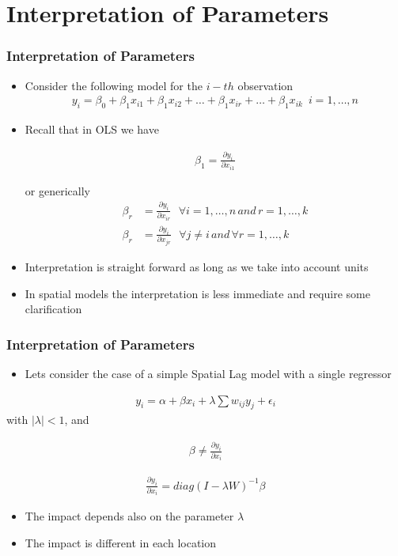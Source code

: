 \documentclass[
  shownotes,
  xcolor={svgnames},
  hyperref={colorlinks,citecolor=DarkBlue,linkcolor=DarkRed,urlcolor=DarkBlue}
  ]{beamer}
\begin{document}
\section{Interpretation of Parameters}
\begin{frame}
\frametitle{Interpretation of Parameters}
\begin{itemize}
  \item Consider the following model for the $i-th$ observation
\begin{align}
y_i = \beta_0 +\beta_1 x_{i1}+\beta_1 x_{i2}+\dots+\beta_1 x_{ir}+\dots+\beta_1 x_{ik} \,\,\, i=1,\dots,n \nonumber
\end{align}

  \item Recall that in OLS we have


\begin{align}
\beta_1=\frac{\partial y_i}{\partial x_{i1}} \nonumber
\end{align}

or generically
\begin{align}
\beta_r&=\frac{\partial y_i}{\partial x_{ir}}  \,\,\,\,  \forall i=1,\dots,n\,and\, r=1,\dots,k \nonumber \\
\beta_r&=\frac{\partial y_i}{\partial x_{jr}} \,\,\,\,  \forall j\neq i\,and\, \forall r=1,\dots,k \nonumber
\end{align}

\item Interpretation is straight forward as long as we take into account units
\medskip
\item In spatial models the interpretation is less immediate and require some clarification
\end{itemize}

\end{frame}
\begin{frame}
\frametitle{Interpretation of Parameters}
\begin{itemize}
\item Lets consider the case of a simple Spatial Lag model with a single regressor
\end{itemize}

\begin{align}
y_i = \alpha + \beta x_i + \lambda \sum w_{ij} y_j + \epsilon_i
\end{align}
with $|\lambda|<1$, and 

\begin{align}
\beta \neq \frac{\partial y_i}{\partial x_{i}} \nonumber
\end{align}

\begin{align}
 \frac{\partial y_i}{\partial x_{i}} = diag(I-\lambda W)^{-1}\beta \nonumber
\end{align}
\begin{itemize}
  \item The impact depends also on the parameter $\lambda$
  \item The impact is different in each location
\end{itemize}  


\end{frame}
\end{document}
